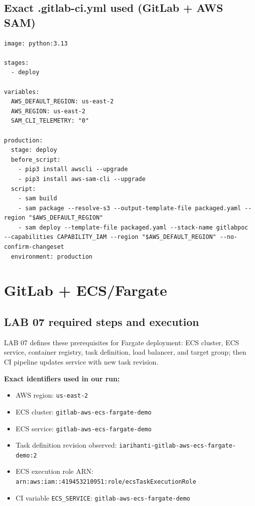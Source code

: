 \documentclass{article}
\begin{document}
\subsection{Exact .gitlab-ci.yml used (GitLab + AWS SAM)}
\begin{lstlisting}
image: python:3.13

stages:
  - deploy

variables:
  AWS_DEFAULT_REGION: us-east-2
  AWS_REGION: us-east-2
  SAM_CLI_TELEMETRY: "0"

production:
  stage: deploy
  before_script:
    - pip3 install awscli --upgrade
    - pip3 install aws-sam-cli --upgrade
  script:
    - sam build
    - sam package --resolve-s3 --output-template-file packaged.yaml --region "$AWS_DEFAULT_REGION"
    - sam deploy --template-file packaged.yaml --stack-name gitlabpoc --capabilities CAPABILITY_IAM --region "$AWS_DEFAULT_REGION" --no-confirm-changeset
  environment: production
\end{lstlisting}

\vspace{5cm}
\section{GitLab + ECS/Fargate}

\subsection{LAB 07 required steps and execution}
LAB 07 defines these prerequisites for Fargate deployment: ECS cluster, ECS service, container registry, task definition, load balancer, and target group; then CI pipeline updates service with new task revision.

\textbf{Exact identifiers used in our run:}
\begin{itemize}
    \item AWS region: \texttt{us-east-2}
    \item ECS cluster: \texttt{gitlab-aws-ecs-fargate-demo}
    \item ECS service: \texttt{gitlab-aws-ecs-fargate-demo}
    \item Task definition revision observed: \texttt{iarihanti-gitlab-aws-ecs-fargate-demo:2}
    \item ECS execution role ARN: \texttt{arn:aws:iam::419453210951:role/ecsTaskExecutionRole}
    \item CI variable \texttt{ECS\_SERVICE}: \texttt{gitlab-aws-ecs-fargate-demo}
\end{itemize}
\end{document}
